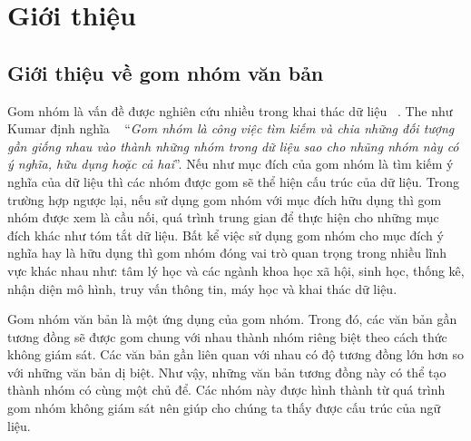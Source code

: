 \chapter{Giới thiệu}
\label{Chapter1}

\section{Giới thiệu về gom nhóm văn bản}

Gom nhóm là vấn đề được nghiên cứu nhiều trong khai thác dữ liệu ~\cite{Jain-Dubes, Jardin-Rijsbergen, Ji-Xu, Jolliffee}.
The như Kumar định nghĩa ~\cite{Vipin-Kumar} ``\textit{Gom nhóm là công việc tìm kiếm và chia những đối tượng gần giống nhau vào thành những nhóm trong dữ liệu sao cho nhũng nhóm này có ý nghĩa, hữu dụng hoặc cả hai}''. %
Nếu như mục đích của gom nhóm là tìm kiếm ý nghĩa của dữ liệu thì các nhóm được gom sẽ thể hiện cấu trúc của dữ liệu.
Trong trường hợp ngược lại, nếu sử dụng gom nhóm với mục đích hữu dụng thì gom nhóm được xem là cầu nối, quá trình trung gian để thực hiện cho những mục đích khác như tóm tắt dữ liệu.
Bất kể việc sử dụng gom nhóm cho mục đích ý nghĩa hay là hữu dụng thì gom nhóm đóng vai trò quan trọng trong nhiều lĩnh vực khác nhau như: tâm lý học và các ngành khoa học xã hội, sinh học, thống kê, nhận diện mô hình, truy vấn thông tin, máy học và khai thác dữ liệu.

Gom nhóm văn bản là một ứng dụng của gom nhóm.
Trong đó, các văn bản gần tương đồng sẽ được gom chung với nhau thành nhóm riêng biệt theo cách thức không giám sát.
Các văn bản gần liên quan với nhau có độ tương đồng lớn hơn so với những văn bản dị biệt.
Như vậy, những văn bản tương đồng này có thể tạo thành nhóm có cùng một chủ để.
Các nhóm này được hình thành từ quá trình gom nhóm không giám sát nên giúp cho chúng ta thấy được cấu trúc của ngữ liệu.

